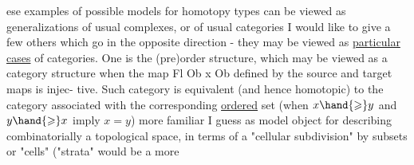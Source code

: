   ese examples of possible models for homotopy types can be viewed
as generalizations of usual complexes,  or of usual categories  I would
like to give a few others which go in the opposite direction  -  they
may be viewed as  \uline{particular cases} of categories.  One is the (pre)order
structure,  which may be viewed as a category structure when the
map    Fl \hand{$\longrightarrow$} Ob x Ob  defined by the source and target maps is injec-%
tive.  Such category is equivalent  (and hence homotopic) to the
category associated with the corresponding \uline{ordered} set (when $x\hand{\geqslant} y$ and
$y\hand{\geqslant} x$ imply $x=y$)   more familiar I guess as  model object for
describing combinatorially a topological space,  in terms of a "cellular
subdivision"  by  subsets or "cells" ("strata" would be a more
\margin{$\times$}
